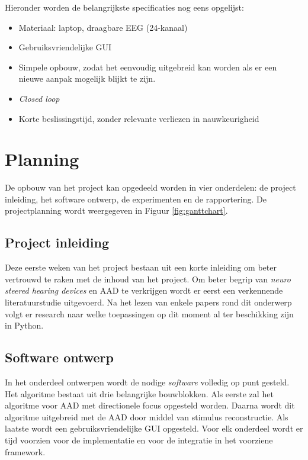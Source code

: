\documentclass[a4paper,kul]{kulakarticle}
\begin{document}
	Hieronder worden de belangrijkste specificaties nog eens opgelijst:
	\begin{itemize}
		\item Materiaal: laptop, draagbare EEG (24-kanaal)
		\item Gebruiksvriendelijke GUI
		\item Simpele opbouw, zodat het eenvoudig uitgebreid kan worden als er een nieuwe aanpak mogelijk blijkt te zijn.
		\item \textit{Closed loop}
		\item Korte beslissingstijd, zonder relevante verliezen in nauwkeurigheid
	\end{itemize}
	

	\section*{Planning}
	De opbouw van het project kan opgedeeld worden in vier onderdelen: de project inleiding, het software ontwerp, de experimenten en de rapportering. De projectplanning wordt weergegeven in Figuur \ref{fig:ganttchart}.
	
	\subsection*{Project inleiding}
	Deze eerste weken van het project bestaan uit een korte inleiding om beter vertrouwd te raken met de inhoud van het project. Om beter begrip van \textit{neuro steered hearing devices} en AAD te verkrijgen wordt er eerst een verkennende literatuurstudie uitgevoerd. Na het lezen van enkele papers rond dit onderwerp volgt er research naar welke toepassingen op dit moment al ter beschikking zijn in Python.\\
	
	
	\subsection*{Software ontwerp}
	In het onderdeel ontwerpen wordt de nodige \textit{software} volledig op punt gesteld. Het algoritme bestaat uit drie belangrijke bouwblokken. Als eerste zal het algoritme voor AAD met directionele focus opgesteld worden. Daarna wordt dit algoritme uitgebreid met de AAD door middel van stimulus reconstructie. Als laatste wordt een gebruiksvriendelijke GUI opgesteld. Voor elk onderdeel wordt er tijd voorzien voor de implementatie en voor de integratie in het voorziene framework.\\
	
\end{document}
